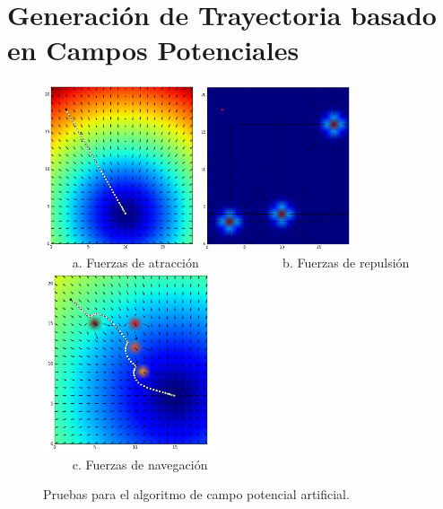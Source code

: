 \section{Generaci\'on de Trayectoria basado en Campos Potenciales}
\label{sec:autonomia}
\begin{figure}%
  	\centering \footnotesize
  	\includegraphics[width=0.40\textwidth]{images/attr_force.png}
  	\includegraphics[width=0.40\textwidth]{images/rep_force.png}
  	\\ $\qquad$ a. Fuerzas de atracción  $\qquad\qquad\qquad$  b. Fuerzas de repulsión
  	\includegraphics[width=0.45\textwidth]{images/nav_force.png}
  	\\ $\qquad$ c. Fuerzas de navegación
  	\captionsetup{font=footnotesize}
  	\caption{Pruebas para el algoritmo de campo potencial artificial.}
  	\label{f:APF}
\end{figure}

